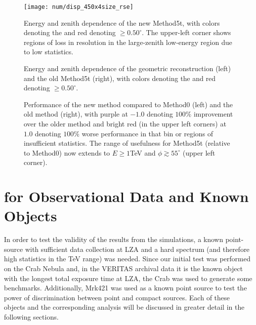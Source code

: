 \documentclass[main.tex]{subfiles}
\begin{document}
\begin{figure}[htbp]
  \centering
  \texttt{[image: num/disp\_450x4size\_rse]}
  \caption[Energy and zenith dependence of the new Method5t.]{Energy and zenith dependence of the new Method5t, with colors denoting the \rse and red denoting \rse$\geq0.50^\circ$. The upper-left corner shows regions of loss in resolution in the large-zenith low-energy region due to low statistics.}
  \label{fig:energy_new_contour}
\end{figure}

\begin{figure}[htbp]
  \centering
  \caption[Energy and zenith dependence of Method0 and the old Method5t]{Energy and zenith dependence of the geometric reconstruction (left) and the old Method5t (right), with colors denoting the \rse and red denoting \rse$\geq0.50^\circ$.}
  \label{fig:energy_contour}
\end{figure}

\begin{figure}[htbp]
  \centering
  \caption[Performance of the new \disp method compared to Method0 and the old \disp method]{Performance of the new \disp method compared to Method0 (left) and the old \disp method (right), with purple at $-1.0$ denoting $100\%$ improvement over the older method and bright red (in the upper left corners) at $1.0$ denoting $100\%$ worse performance in that bin or regions of insufficient statistics. The range of usefulness for Method5t (relative to Method0) now extends to $E\geq1$TeV and $\phi\gtrsim55^\circ$ (upper left corner).}
  \label{fig:energy_rel}
\end{figure}

\section{\rse for Observational Data and Known Objects}
In order to test the validity of the results from the simulations, a known point-source with sufficient data collection at LZA and a hard spectrum (and therefore high statistics in the TeV range) was needed. Since our initial test was performed on the Crab Nebula and, in the VERITAS archival data it is the known object with the longest total exposure time at LZA, the Crab was used to generate some benchmarks. Additionally, Mrk421 was used as a known point source to test the power of discrimination between point and compact sources. Each of these objects and the corresponding analysis will be discussed in greater detail in the following sections.
\end{document}
